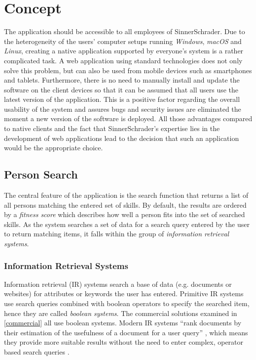 \chapter{Concept}
The application should be accessible to all employees of SinnerSchrader. Due to the heterogeneity of the users' computer setups running \textit{Windows}, \textit{macOS} and \textit{Linux}, creating a native application supported by everyone’s system is a rather complicated task. A web application using standard technologies does not only solve this problem, but can also be used from mobile devices such as smartphones and tablets. Furthermore, there is no need to manually install and update the software on the client devices so that it can be assumed that all users use the latest version of the application. This is a positive factor regarding the overall usability of the system and assures bugs and security issues are eliminated the moment a new version of the software is deployed. All those advantages compared to native clients and the fact that SinnerSchrader’s expertise lies in the development of web applications lead to the decision that such an application would be the appropriate choice.

\section{Person Search}
The central feature of the application is the search function that returns a list of all persons matching the entered set of skills. By default, the results are ordered by a \textit{fitness score} which describes how well a person fits into the set of searched skills.
As the system searches a set of data for a search query entered by the user to return matching items, it falls within the group of \textit{information retrieval systems}.

\subsection{Information Retrieval Systems}
Information retrieval (IR) systems search a base of data (e.g. documents or websites) for attributes or keywords the user has entered.
Primitive IR systems use search queries combined with boolean operators to specify the searched item, hence they are called \textit{boolean systems}. The commercial solutions examined in \ref{commercial} all use boolean systems.
Modern IR systems ``rank documents by their estimation of the usefulness of a document for a user query'' \cite{IR}, which means they provide more suitable results without the need to enter complex, operator based search queries \cite{IR}.

